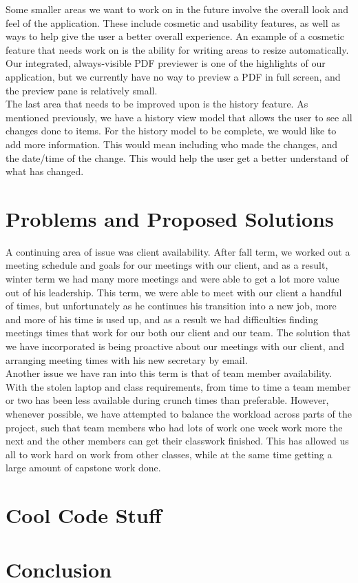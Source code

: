 \documentclass[onecolumn, draftclsnofoot,10pt, compsoc]{IEEEtran}
\begin{document}
\noindent Some smaller areas we want to work on in the future involve the overall look and feel of the application.
These include cosmetic and usability features, as well as ways to help give the user a better overall experience.
An example of a cosmetic feature that needs work on is the ability for writing areas
to resize automatically. Our integrated, always-visible PDF previewer is one of the highlights of our
application, but we currently have no way to preview a PDF in full screen, and the preview pane is relatively small. \\

\noindent The last area that needs to be improved upon is the history feature. As mentioned previously,
we have a history view model that allows the user to see all changes done to items. For the history model
to be complete, we would like to add more information. This would mean including who made the changes,
and the date/time of the change. This would help the user get a better understand of what has changed. \\

\newpage

\section{Problems and Proposed Solutions}

\noindent A continuing area of issue was client availability. After fall term, we worked out a meeting schedule
and goals for our meetings with our client, and as a result, winter term we had many more meetings and
were able to get a lot more value out of his leadership. This term, we were able to meet with
our client a handful of times, but unfortunately as he continues his transition into a new job,
more and more of his time is used up, and as a result we had difficulties finding
meetings times that work for our both our client and our team. The solution that we have incorporated is being proactive
about our meetings with our client, and arranging meeting times with his new secretary by email.\\

\noindent Another issue we have ran into this term is that of team member availability.
With the stolen laptop and class requirements, from time to time a team member or two has been less
available during crunch times than preferable. However, whenever possible, we have attempted to
balance the workload across parts of the project, such that team members who had lots of work one week
work more the next and the other members can get their classwork finished. This has allowed us all
to work hard on work from other classes, while at the same time getting a large amount of
capstone work done. \\

\newpage

\section{Cool Code Stuff}

\section{Conclusion}
\end{document}
